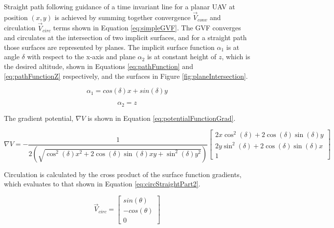 \documentclass[conf]{new-aiaa}
\begin{document}
Straight path following guidance of a time invariant line for a planar UAV at position $(x,y)$ is achieved by summing together convergence $\overrightarrow{V}_{conv}$ and circulation $\overrightarrow{V}_{circ}$ terms shown in Equation \ref{eq:simpleGVF}. The GVF converges and circulates at the intersection of two implicit surfaces, and for a straight path those surfaces are represented by planes. The implicit surface function $\alpha_1$ is at angle $\delta$ with respect to the x-axis and plane $\alpha_2$ is at constant height of $z$, which is the desired altitude, shown in Equations \ref{eq:pathFunction} and \ref{eq:pathFunctionZ} respectively, and the surfaces in Figure \ref{fig:planeIntersection}.


\begin{equation}
\label{eq:pathFunction}
\alpha_1 = cos(\delta)x + sin(\delta)y
\end{equation}

\begin{equation}
\label{eq:pathFunctionZ}
\alpha_2 = z
\end{equation}

\noindent
The gradient potential, $\nabla V$ is shown in Equation \ref{eq:potentialFunctionGrad}.

\begin{equation}
\label{eq:potentialFunctionGrad}
\nabla V = -\frac{1}{2(\sqrt{\cos^2(\delta) x^2+2\cos(\delta)\sin(\delta) xy +\sin^2 (\delta) y^2})} \begin{bmatrix}
2x\cos^2(\delta) + 2\cos(\delta)\sin(\delta) y \\
2y\sin^2(\delta) + 2\cos(\delta)\sin(\delta) x \\
1
\end{bmatrix}
\end{equation}

\noindent
Circulation is calculated by the cross product of the surface function gradients, which evaluates to that shown in Equation \ref{eq:circStraightPart2}.



\begin{equation}
\label{eq:circStraightPart2}
\overrightarrow{V}_{circ} = \begin{bmatrix}
sin(\theta) \\
-cos(\theta) \\
0
\end{bmatrix}
\end{equation}
\end{document}
